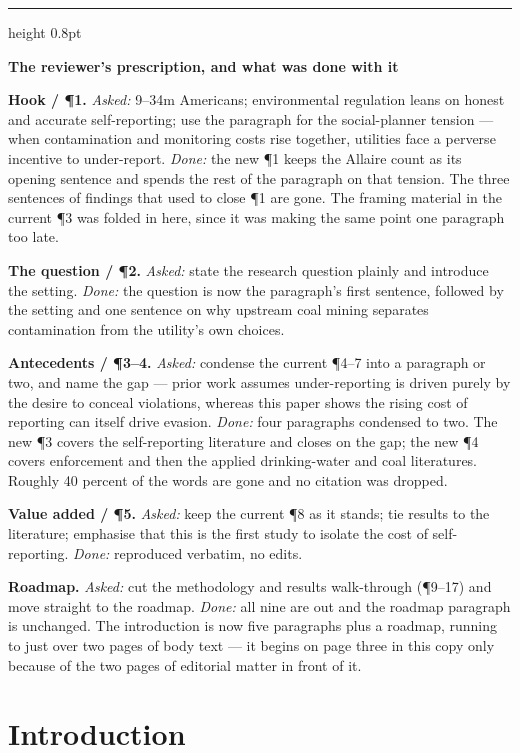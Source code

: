 \documentclass[12pt]{article}
\newenvironment{editnote}[1]{%
  \par\medskip\noindent
  \begin{minipage}{\linewidth}%
  {\color{boxrule}\hrule height 0.8pt}\smallskip
  {\sffamily\bfseries\small #1\par}\smallskip
  \small\singlespacing\raggedright
  \setlength{\parindent}{0pt}\setlength{\parskip}{0.5em}\ignorespaces
}{%
  \par\smallskip{\color{boxrule}\hrule height 0.8pt}%
  \end{minipage}\par\medskip
}
\begin{document}
\begin{editnote}{The reviewer's prescription, and what was done with it}
\textbf{Hook / \P1.} \emph{Asked:} 9--34m Americans; environmental regulation leans on
honest and accurate self-reporting; use the paragraph for the social-planner tension
--- when contamination and monitoring costs rise together, utilities face a perverse
incentive to under-report. \emph{Done:} the new \P1 keeps the Allaire count as its
opening sentence and spends the rest of the paragraph on that tension. The three
sentences of findings that used to close \P1 are gone. The framing material in the
current \P3 was folded in here, since it was making the same point one paragraph too
late.

\textbf{The question / \P2.} \emph{Asked:} state the research question plainly and
introduce the setting. \emph{Done:} the question is now the paragraph's first sentence,
followed by the setting and one sentence on why upstream coal mining separates
contamination from the utility's own choices.

\textbf{Antecedents / \P3--4.} \emph{Asked:} condense the current \P4--7 into a
paragraph or two, and name the gap --- prior work assumes under-reporting is driven
purely by the desire to conceal violations, whereas this paper shows the rising cost of
reporting can itself drive evasion. \emph{Done:} four paragraphs condensed to two. The
new \P3 covers the self-reporting literature and closes on the gap; the new \P4 covers
enforcement and then the applied drinking-water and coal literatures. Roughly 40 percent
of the words are gone and no citation was dropped.

\textbf{Value added / \P5.} \emph{Asked:} keep the current \P8 as it stands; tie results
to the literature; emphasise that this is the first study to isolate the cost of
self-reporting. \emph{Done:} reproduced verbatim, no edits.

\textbf{Roadmap.} \emph{Asked:} cut the methodology and results walk-through
(\P9--17) and move straight to the roadmap. \emph{Done:} all nine are out and the
roadmap paragraph is unchanged. The introduction is now five paragraphs plus a roadmap,
running to just over two pages of body text --- it begins on page three in this copy
only because of the two pages of editorial matter in front of it.
\end{editnote}

\clearpage
\onehalfspacing

\section{Introduction}
\end{document}
